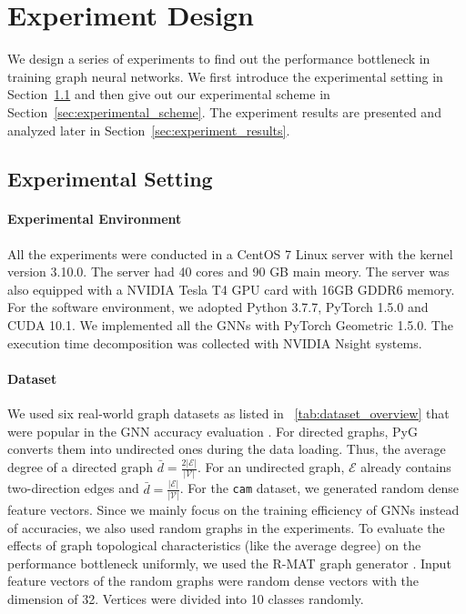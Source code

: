 \section{Experiment Design}

We design a series of experiments to find out the performance bottleneck in training graph neural networks.
We first introduce the experimental setting in Section~\ref{sec:experimental_env} and then give out our experimental scheme in Section~\ref{sec:experimental_scheme}.
The experiment results are presented and analyzed later in Section~\ref{sec:experiment_results}.

\subsection{Experimental Setting}
\label{sec:experimental_env}

\paragraph{Experimental Environment}
All the experiments were conducted in a CentOS 7 Linux server with the kernel version 3.10.0.
The server had 40 cores and 90 GB main meory.
The server was also equipped with a NVIDIA Tesla T4 GPU card with 16GB GDDR6 memory.
For the software environment, we adopted Python 3.7.7, PyTorch 1.5.0 and CUDA 10.1.
We implemented all the GNNs with PyTorch Geometric 1.5.0.
The execution time decomposition was collected with NVIDIA Nsight systems.

\paragraph{Dataset}
We used six real-world graph datasets as listed in \tablename~\ref{tab:dataset_overview} that were popular in the GNN accuracy evaluation \cite{yang2016_revisiting_semisupervised, zeng2020_graphsaint, shchur2018_pitfall_of_gnn}.
For directed graphs, PyG converts them into undirected ones during the data loading.
Thus, the average degree of a directed graph $\bar{d}=\frac{2|\mathcal{E}|}{|\mathcal{V}|}$.
For an undirected graph, $\mathcal{E}$ already contains two-direction edges and $\bar{d}=\frac{|\mathcal{E}|}{|\mathcal{V}|}$.
For the \texttt{cam} dataset, we generated random dense feature vectors.
Since we mainly focus on the training efficiency of GNNs instead of accuracies, we also used random graphs in the experiments.
To evaluate the effects of graph topological characteristics (like the average degree) on the performance bottleneck uniformly, we used the R-MAT graph generator \cite{rmat-generator}.
Input feature vectors of the random graphs were random dense vectors with the dimension of 32.
Vertices were divided into 10 classes randomly.

